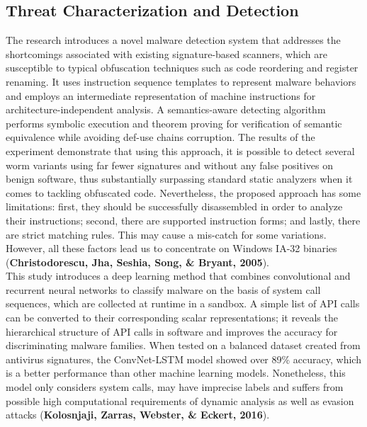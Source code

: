 \subsection{Threat Characterization and Detection}
The research introduces a novel malware detection system that addresses the shortcomings associated with existing signature-based scanners, which are susceptible to typical obfuscation techniques such as code reordering and register renaming. It uses instruction sequence templates to represent malware behaviors and employs an intermediate representation of machine instructions for architecture-independent analysis. A semantics-aware detecting algorithm performs symbolic execution and theorem proving for verification of semantic equivalence while avoiding def-use chains corruption. The results of the experiment demonstrate that using this approach, it is possible to detect several worm variants using far fewer signatures and without any false positives on benign software, thus substantially surpassing standard static analyzers when it comes to tackling obfuscated code. Nevertheless, the proposed approach has some limitations: first, they should be successfully disassembled in order to analyze their instructions; second, there are supported instruction forms; and lastly, there are strict matching rules. This may cause a mis-catch for some variations. However, all these factors lead us to concentrate on Windows IA-32 binaries (\textbf{Christodorescu, Jha, Seshia, Song, \& Bryant, 2005})\cite{Christodorescu}.\\

This study introduces a deep learning method that combines convolutional and recurrent neural networks to classify malware on the basis of system call sequences, which are collected at runtime in a sandbox. A simple list of API calls can be converted to their corresponding scalar representations; it reveals the hierarchical structure of API calls in software and improves the accuracy for discriminating malware families. When tested on a balanced dataset created from antivirus signatures, the ConvNet-LSTM model showed over 89\% accuracy, which is a better performance than other machine learning models. Nonetheless, this model only considers system calls, may have imprecise labels and suffers from possible high computational requirements of dynamic analysis as well as evasion attacks (\textbf{Kolosnjaji, Zarras, Webster, \& Eckert, 2016})\cite{Kolosnjaji}.\\

